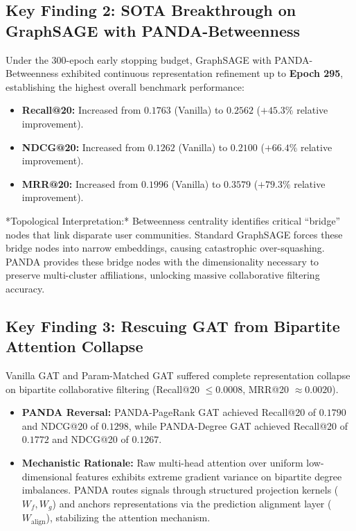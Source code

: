 \documentclass[11pt,a4paper]{article}
\begin{document}
\subsection{Key Finding 2: SOTA Breakthrough on GraphSAGE with PANDA-Betweenness}
Under the 300-epoch early stopping budget, GraphSAGE with PANDA-Betweenness exhibited continuous representation refinement up to \textbf{Epoch 295}, establishing the highest overall benchmark performance:
\begin{itemize}
    \item \textbf{Recall@20:} Increased from $0.1763$ (Vanilla) to $\mathbf{0.2562}$ ($+\mathbf{45.3\%}$ relative improvement).
    \item \textbf{NDCG@20:} Increased from $0.1262$ (Vanilla) to $\mathbf{0.2100}$ ($+\mathbf{66.4\%}$ relative improvement).
    \item \textbf{MRR@20:} Increased from $0.1996$ (Vanilla) to $\mathbf{0.3579}$ ($+\mathbf{79.3\%}$ relative improvement).
\end{itemize}
*Topological Interpretation:* Betweenness centrality identifies critical ``bridge'' nodes that link disparate user communities. Standard GraphSAGE forces these bridge nodes into narrow embeddings, causing catastrophic over-squashing. PANDA provides these bridge nodes with the dimensionality necessary to preserve multi-cluster affiliations, unlocking massive collaborative filtering accuracy.

\subsection{Key Finding 3: Rescuing GAT from Bipartite Attention Collapse}
Vanilla GAT and Param-Matched GAT suffered complete representation collapse on bipartite collaborative filtering (Recall@20 $\le 0.0008$, MRR@20 $\approx 0.0020$).
\begin{itemize}
    \item \textbf{PANDA Reversal:} PANDA-PageRank GAT achieved Recall@20 of $\mathbf{0.1790}$ and NDCG@20 of $\mathbf{0.1298}$, while PANDA-Degree GAT achieved Recall@20 of $\mathbf{0.1772}$ and NDCG@20 of $\mathbf{0.1267}$.
    \item \textbf{Mechanistic Rationale:} Raw multi-head attention over uniform low-dimensional features exhibits extreme gradient variance on bipartite degree imbalances. PANDA routes signals through structured projection kernels ($W_f, W_g$) and anchors representations via the prediction alignment layer ($W_{\text{align}}$), stabilizing the attention mechanism.
\end{itemize}
\end{document}
